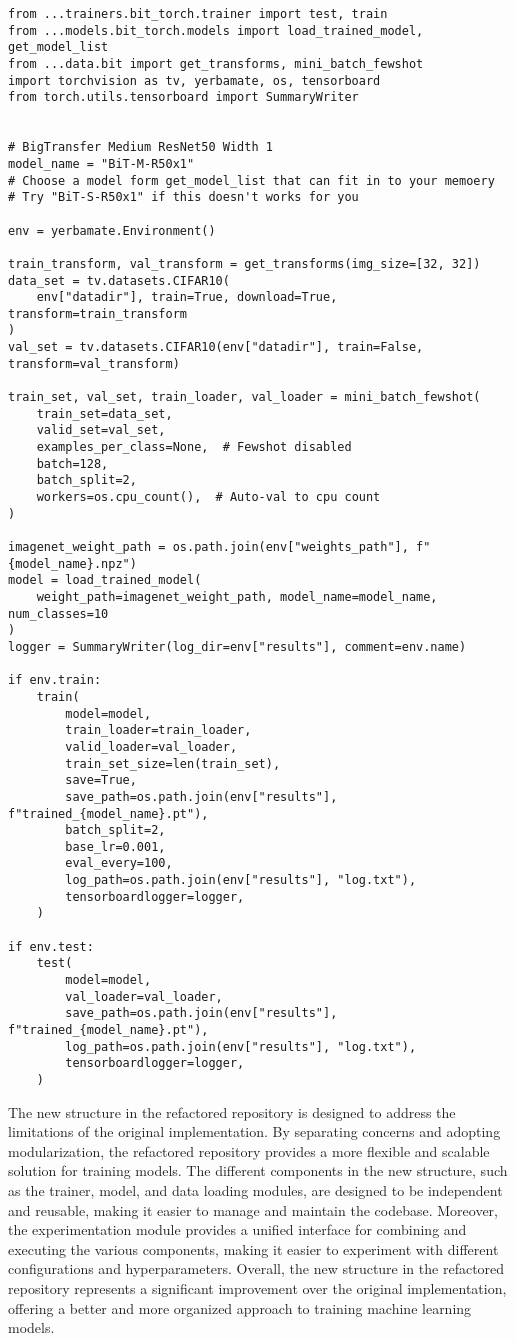 \begin{verbatim}
from ...trainers.bit_torch.trainer import test, train
from ...models.bit_torch.models import load_trained_model, get_model_list
from ...data.bit import get_transforms, mini_batch_fewshot
import torchvision as tv, yerbamate, os, tensorboard
from torch.utils.tensorboard import SummaryWriter


# BigTransfer Medium ResNet50 Width 1
model_name = "BiT-M-R50x1"
# Choose a model form get_model_list that can fit in to your memoery
# Try "BiT-S-R50x1" if this doesn't works for you

env = yerbamate.Environment()

train_transform, val_transform = get_transforms(img_size=[32, 32])
data_set = tv.datasets.CIFAR10(
    env["datadir"], train=True, download=True, transform=train_transform
)
val_set = tv.datasets.CIFAR10(env["datadir"], train=False, transform=val_transform)

train_set, val_set, train_loader, val_loader = mini_batch_fewshot(
    train_set=data_set,
    valid_set=val_set,
    examples_per_class=None,  # Fewshot disabled
    batch=128,
    batch_split=2,
    workers=os.cpu_count(),  # Auto-val to cpu count
)

imagenet_weight_path = os.path.join(env["weights_path"], f"{model_name}.npz")
model = load_trained_model(
    weight_path=imagenet_weight_path, model_name=model_name, num_classes=10
)
logger = SummaryWriter(log_dir=env["results"], comment=env.name)

if env.train:
    train(
        model=model,
        train_loader=train_loader,
        valid_loader=val_loader,
        train_set_size=len(train_set),
        save=True,
        save_path=os.path.join(env["results"], f"trained_{model_name}.pt"),
        batch_split=2,
        base_lr=0.001,
        eval_every=100,
        log_path=os.path.join(env["results"], "log.txt"),
        tensorboardlogger=logger,
    )

if env.test:
    test(
        model=model,
        val_loader=val_loader,
        save_path=os.path.join(env["results"], f"trained_{model_name}.pt"),
        log_path=os.path.join(env["results"], "log.txt"),
        tensorboardlogger=logger,
    )

\end{verbatim}


The new structure in the refactored repository is designed to address the limitations of the original implementation. By separating concerns and adopting modularization, the refactored repository provides a more flexible and scalable solution for training models. The different components in the new structure, such as the trainer, model, and data loading modules, are designed to be independent and reusable, making it easier to manage and maintain the codebase. Moreover, the experimentation module provides a unified interface for combining and executing the various components, making it easier to experiment with different configurations and hyperparameters. Overall, the new structure in the refactored repository represents a significant improvement over the original implementation, offering a better and more organized approach to training machine learning models.
